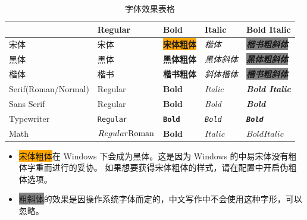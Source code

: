 \begin{table}[htb]
	\centering
	\caption{字体效果表格}
	\begin{tabular}{@{}lllll@{}}
		\toprule
		& Regular & Bold & Italic & Bold Italic \\ \midrule
		宋体       & 宋体      & \colorbox{orange}{\textbf{宋体粗体}} & \textit{楷体}     &   \colorbox{gray}{\textbf{\textit{楷书粗斜体}}}  \\
		黑体         & {\heiti{}黑体}      & \textbf{\heiti{}黑体粗体} &   \textit{\heiti{}黑体斜体}     & \colorbox{gray}{\textit{\textbf{\heiti{}黑体粗斜体}}}   \\
		楷体         & {\kaishu{}楷书}      & \textbf{\kaishu{}楷书粗体} & \textit{\kaishu{}斜体楷体} &  \colorbox{gray}{\textbf{\textit{\kaishu{}楷书粗斜体}}}    \\
		Serif(Roman/Normal)      &    Regular    &  \textbf{Bold}  &    \textit{Italic}    &     \textbf{\textit{Bold Italic}}    \\
		Sans Serif &  \textsf{Regular}       &  \textbf{\textsf{Bold}}    &  \textit{\textsf{Bold}}   &    \textbf{\textit{\textsf{Bold}}}   \\
		Typewriter &  \texttt{Regular}       &  \textbf{\texttt{Bold}}    &  \textit{\texttt{Bold}}   &    \textbf{\textit{\texttt{Bold}}}   \\
		Math       &   $\mathnormal{Regular} \mathrm{Roman}$  & $\mathbf{Bold}$   &    $\mathit{Italic}$    &  $\mathbf{\mathit{Bold Italic}}$    \\ \bottomrule
	\end{tabular}
\end{table}

\begin{itemize}[nosep]
	\item \colorbox{orange}{宋体粗体}在 Windows 下会成为黑体。这是因为 Windows 的中易宋体没有粗体字重而进行的妥协。
	如果想要获得宋体粗体的样式，请在配置中开启伪粗体选项。
	\item \colorbox{gray}{粗斜体}的效果是因操作系统字体而定的，中文写作中不会使用这种字形，可以忽略。
\end{itemize}

